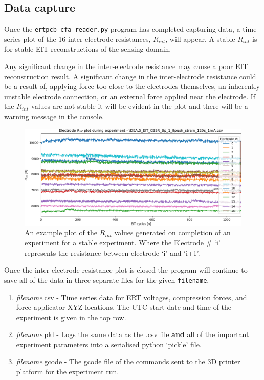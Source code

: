 \subsection{Data capture}
Once the \verb|ertpcb_cfa_reader.py| program has completed capturing data, a time-series plot of the 16 inter-electrode resistances, $R_{int}$, will appear. A stable $R_{int}$ is for stable EIT reconstructions of the sensing domain.  

Any significant change in the inter-electrode resistance may cause a poor EIT reconstruction result. A significant change in the inter-electrode resistance could be a result of, applying force too close to the electrodes themselves, an inherently unstable electrode connection, or an external force applied near the electrode. If the $R_{int}$ values are not stable it will be evident in the plot and there will be a warning message in the console. 
\begin{figure}[H]
\centering
\includegraphics[width=0.75\linewidth]{Figures/Rint_plot.png}
\caption{An example plot of the $R_{int}$ values generated on completion of an experiment for a stable experiment. Where the Electrode \# `i' represents the resistance between electrode `i' and `i+1'.}
\label{fig:ert_pcb_pinout_mode}
\end{figure}
Once the inter-electrode resistance plot is closed the program will continue to save all of the data in three separate files for the given \verb|filename|,
\begin{enumerate}
\item \textit{filename}.csv - Time series data for ERT voltages, compression forces, and force applicator XYZ locations. The UTC start date and time of the experiment is given in the top row.  
\item \textit{filename}.pkl - Logs the same data as the .csv file \textbf{and} all of the important experiment parameters into a serialised python `pickle' file.
\item \textit{filename}.gcode - The gcode file of the commands sent to the 3D printer platform for the experiment run.
\end{enumerate}



